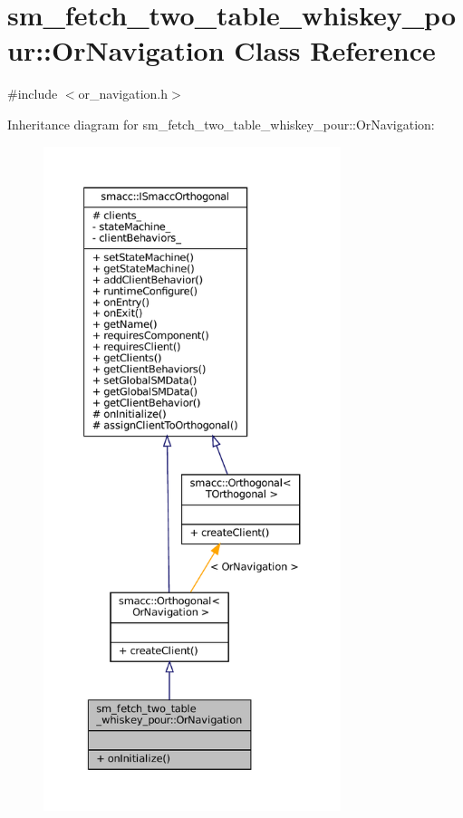 \hypertarget{classsm__fetch__two__table__whiskey__pour_1_1OrNavigation}{}\section{sm\+\_\+fetch\+\_\+two\+\_\+table\+\_\+whiskey\+\_\+pour\+:\+:Or\+Navigation Class Reference}
\label{classsm__fetch__two__table__whiskey__pour_1_1OrNavigation}


{\ttfamily \#include $<$or\+\_\+navigation.\+h$>$}



Inheritance diagram for sm\+\_\+fetch\+\_\+two\+\_\+table\+\_\+whiskey\+\_\+pour\+:\+:Or\+Navigation\+:
\nopagebreak
\begin{figure}[H]
\begin{center}
\leavevmode
\includegraphics[height=550pt]{classsm__fetch__two__table__whiskey__pour_1_1OrNavigation__inherit__graph}
\end{center}
\end{figure}


